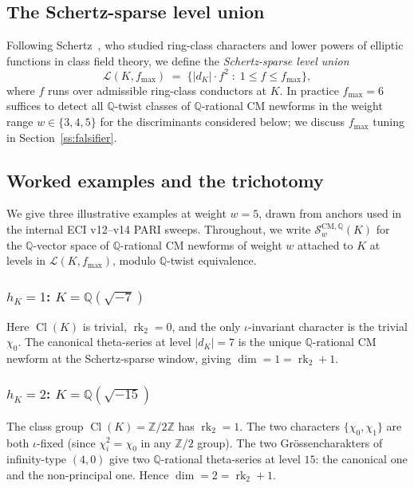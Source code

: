 \documentclass[11pt,a4paper]{amsart}
\theoremstyle{definition}
\DeclareMathOperator{\Cl}{Cl}
\DeclareMathOperator{\rk}{rk}
\newcommand{\Q}{\mathbb{Q}}
\newcommand{\Z}{\mathbb{Z}}
\newcommand{\Lcal}{\mathcal{L}}
\newcommand{\Scal}{\mathcal{S}}
\newcommand{\rktwo}{\rk_{2}}
\begin{document}
\subsection{The Schertz-sparse level union}\label{ss:Schutt-level-union}

Following Schertz~\cite{Schertz1976}, who studied ring-class characters and lower powers
of elliptic functions in class field theory, we define the \emph{Schertz-sparse level
union}
\begin{equation}\label{eq:level-union}
  \Lcal(K, f_{\max}) \;=\; \bigl\{ |d_K|\cdot f^2 \;:\; 1 \le f \le f_{\max} \bigr\},
\end{equation}
where $f$ runs over admissible ring-class conductors at $K$. In practice $f_{\max} = 6$
suffices to detect all $\Q$-twist classes of $\Q$-rational CM newforms in the
weight range $w \in \{3, 4, 5\}$ for the discriminants considered below; we discuss
$f_{\max}$ tuning in Section~\ref{ss:falsifier}.

\subsection{Worked examples and the trichotomy}\label{ss:Schutt-trichotomy}

We give three illustrative examples at weight $w = 5$, drawn from anchors used in the
internal ECI v12--v14 PARI sweeps. Throughout, we write $\Scal_w^{\mathrm{CM},\Q}(K)$
for the $\Q$-vector space of $\Q$-rational CM newforms of weight $w$ attached to $K$
at levels in $\Lcal(K, f_{\max})$, modulo $\Q$-twist equivalence.

\subsubsection{$h_K = 1$: $K = \Q(\sqrt{-7})$}\label{sss:hK1}
Here $\Cl(K)$ is trivial, $\rktwo = 0$, and the only $\iota$-invariant character is the
trivial $\chi_0$. The canonical theta-series at level $|d_K| = 7$ is the unique
$\Q$-rational CM newform at the Schertz-sparse window, giving $\dim = 1 = \rktwo + 1$.

\subsubsection{$h_K = 2$: $K = \Q(\sqrt{-15})$}\label{sss:hK2}
The class group $\Cl(K) = \Z/2\Z$ has $\rktwo = 1$. The two characters $\{\chi_0, \chi_1\}$
are both $\iota$-fixed (since $\chi_i^2 = \chi_0$ in any $\Z/2$ group). The two
Gr\"ossencharakters of infinity-type $(4, 0)$ give two $\Q$-rational theta-series at
level $15$: the canonical one and the non-principal one. Hence $\dim = 2 = \rktwo + 1$.
\end{document}
